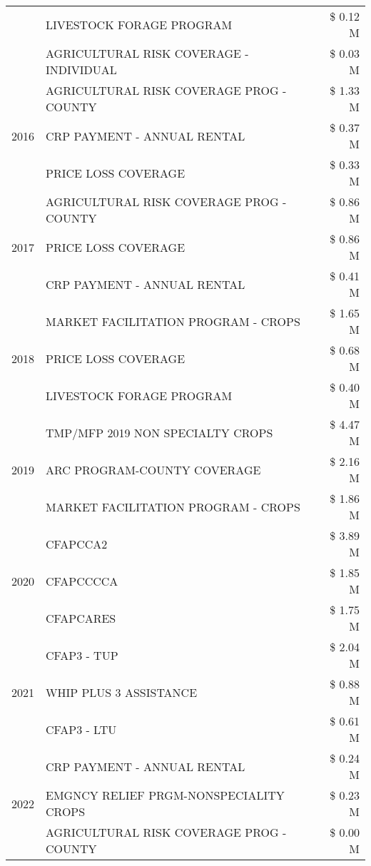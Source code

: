 \begin{tabular}{llr}
 & LIVESTOCK FORAGE PROGRAM & \$ 0.12 M \\
 & AGRICULTURAL RISK COVERAGE - INDIVIDUAL & \$ 0.03 M \\
\cline{1-3}
\multirow[t]{3}{*}{2016} & AGRICULTURAL RISK COVERAGE PROG - COUNTY & \$ 1.33 M \\
 & CRP PAYMENT - ANNUAL RENTAL & \$ 0.37 M \\
 & PRICE LOSS COVERAGE & \$ 0.33 M \\
\cline{1-3}
\multirow[t]{3}{*}{2017} & AGRICULTURAL RISK COVERAGE PROG - COUNTY & \$ 0.86 M \\
 & PRICE LOSS COVERAGE & \$ 0.86 M \\
 & CRP PAYMENT - ANNUAL RENTAL & \$ 0.41 M \\
\cline{1-3}
\multirow[t]{3}{*}{2018} & MARKET FACILITATION PROGRAM - CROPS & \$ 1.65 M \\
 & PRICE LOSS COVERAGE & \$ 0.68 M \\
 & LIVESTOCK FORAGE PROGRAM & \$ 0.40 M \\
\cline{1-3}
\multirow[t]{3}{*}{2019} & TMP/MFP 2019 NON SPECIALTY CROPS & \$ 4.47 M \\
 & ARC PROGRAM-COUNTY COVERAGE & \$ 2.16 M \\
 & MARKET FACILITATION PROGRAM - CROPS & \$ 1.86 M \\
\cline{1-3}
\multirow[t]{3}{*}{2020} & CFAPCCA2 & \$ 3.89 M \\
 & CFAPCCCCA & \$ 1.85 M \\
 & CFAPCARES & \$ 1.75 M \\
\cline{1-3}
\multirow[t]{3}{*}{2021} & CFAP3 - TUP & \$ 2.04 M \\
 & WHIP PLUS 3 ASSISTANCE & \$ 0.88 M \\
 & CFAP3 - LTU & \$ 0.61 M \\
\cline{1-3}
\multirow[t]{3}{*}{2022} & CRP PAYMENT - ANNUAL RENTAL & \$ 0.24 M \\
 & EMGNCY RELIEF PRGM-NONSPECIALITY CROPS & \$ 0.23 M \\
 & AGRICULTURAL RISK COVERAGE PROG - COUNTY & \$ 0.00 M \\
\cline{1-3}
\bottomrule
\end{tabular}
